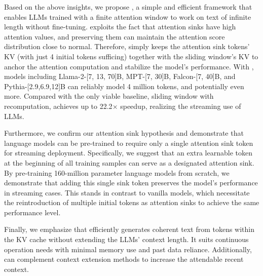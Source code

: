 Based on the above insights, we propose \method, a simple and efficient framework that enables LLMs trained with a finite attention window to work on text of infinite length without fine-tuning. \method exploits the fact that attention sinks have high attention values, and preserving them can maintain the attention score distribution close to normal. Therefore, \method simply keeps the attention sink tokens' KV (with just 4 initial tokens sufficing) together with the sliding window's KV to anchor the attention computation and stabilize the model's performance. With \method, models including Llama-2-[7, 13, 70]B, MPT-[7, 30]B, Falcon-[7, 40]B, and Pythia-[2.9,6.9,12]B can reliably model 4 million tokens, and potentially even more. Compared with the only viable baseline, sliding window with recomputation, \method achieves up to 22.2$\times$ speedup, realizing the streaming use of LLMs.

Furthermore, we confirm our attention sink hypothesis and demonstrate that language models can be pre-trained to require only a single attention sink token for streaming deployment.
Specifically, we suggest that an extra learnable token at the beginning of all training samples can serve as a designated attention sink.
By pre-training 160-million parameter language models from scratch, we demonstrate that adding this single sink token preserves the model's performance in streaming cases. This stands in contrast to vanilla models, which necessitate the reintroduction of multiple initial tokens as attention sinks to achieve the same performance level.


Finally, we emphasize that \method efficiently generates coherent text from tokens within the KV cache without extending the LLMs' context length. It suits continuous operation needs with minimal memory use and past data reliance. Additionally, \method can complement context extension methods to increase the attendable recent context.
